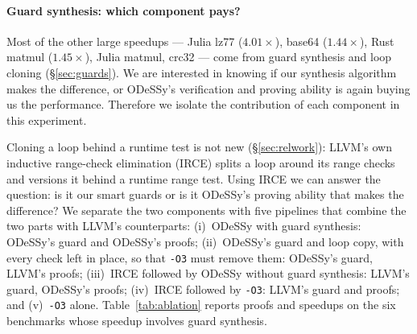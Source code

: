 \documentclass[acmsmall,screen,nonacm]{acmart}
\newcommand{\odessy}{ODeSSy}
\newcommand{\tool}{\odessy}
\begin{document}
\paragraph{Guard synthesis: which component pays?}
Most of the other large speedups --- Julia lz77 ($4.01\times$), base64
($1.44\times$), Rust matmul ($1.45\times$), Julia matmul, crc32 --- come
from guard synthesis and loop cloning (\S\ref{sec:guards}). We are interested in knowing if our synthesis algorithm makes the difference, or \tool{}'s verification and proving ability is again buying us the performance. Therefore we isolate the contribution of each component in this experiment.

Cloning a
loop behind a runtime test is not new (\S\ref{sec:relwork}): LLVM's own
inductive range-check elimination (IRCE) splits a loop around its range
checks and versions it behind a runtime range test. Using IRCE we can answer the question: is it our smart guards or is it \tool{}'s proving ability that makes the difference? We
separate the two components with five pipelines that combine the two parts with
LLVM's counterparts:
(i)~\tool{} with guard synthesis: \tool{}'s guard and \tool{}'s proofs;
(ii)~\tool{}'s guard and loop copy, with every check left in place, so
that \texttt{-O3} must remove them: \tool{}'s guard, LLVM's proofs;
(iii)~IRCE followed by \tool{} without guard synthesis: LLVM's guard,
\tool{}'s proofs;
(iv)~IRCE followed by \texttt{-O3}: LLVM's guard and proofs; and
(v)~\texttt{-O3} alone. 
Table~\ref{tab:ablation} reports proofs and speedups on the six
benchmarks whose speedup involves guard synthesis.
\end{document}
